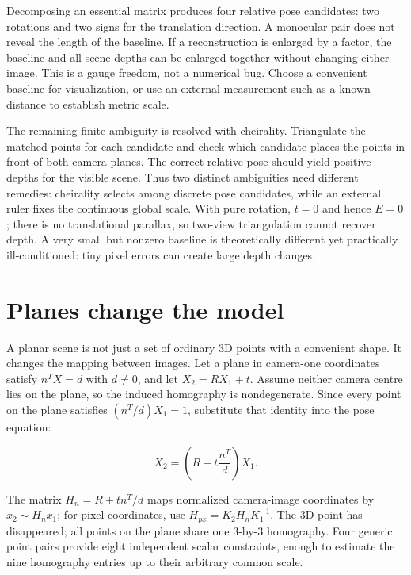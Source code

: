 Decomposing an essential matrix produces four relative pose candidates: two rotations and two signs for the translation direction. A monocular pair does not reveal the length of the baseline. If a reconstruction is enlarged by a factor, the baseline and all scene depths can be enlarged together without changing either image. This is a gauge freedom, not a numerical bug. Choose a convenient baseline for visualization, or use an external measurement such as a known distance to establish metric scale.

The remaining finite ambiguity is resolved with cheirality. Triangulate the matched points for each candidate and check which candidate places the points in front of both camera planes. The correct relative pose should yield positive depths for the visible scene. Thus two distinct ambiguities need different remedies: cheirality selects among discrete pose candidates, while an external ruler fixes the continuous global scale. With pure rotation, \(t=0\) and hence \(E=0\); there is no translational parallax, so two-view triangulation cannot recover depth. A very small but nonzero baseline is theoretically different yet practically ill-conditioned: tiny pixel errors can create large depth changes.

\section{Planes change the model}\label{02-foundations-ii-ch036-planes-change-the-model}

\hypertarget{02-foundations-ii-ch036-planes-change-the-model}{}

A planar scene is not just a set of ordinary 3D points with a convenient shape. It changes the mapping between images. Let a plane in camera-one coordinates satisfy \(n^TX=d\) with \(d\ne0\), and let \(X_2=RX_1+t\). Assume neither camera centre lies on the plane, so the induced homography is nondegenerate. Since every point on the plane satisfies \((n^T/d)X_1=1\), substitute that identity into the pose equation:

\[X_2=\left(R+t\frac{n^T}{d}\right)X_1.\]

The matrix \(H_n=R+t n^T/d\) maps normalized camera-image coordinates by \(x_2\sim H_nx_1\); for pixel coordinates, use \(H_{px}=K_2H_nK_1^{-1}\). The 3D point has disappeared; all points on the plane share one 3-by-3 homography. Four generic point pairs provide eight independent scalar constraints, enough to estimate the nine homography entries up to their arbitrary common scale.

